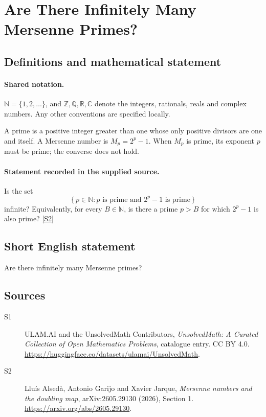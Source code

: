 \documentclass[11pt]{article}
\newcommand{\sref}[2]{\hyperlink{source:#1:#2}{[S#2]}}
\begin{document}
\section{Are There Infinitely Many Mersenne Primes?}\label{statement}

\subsection{Definitions and mathematical statement}

\paragraph{Shared notation.}$\mathbb N=\{1,2,\ldots\}$, and $\mathbb Z,\mathbb Q,\mathbb R,\mathbb C$ denote the integers, rationals, reals and complex numbers. Any other conventions are specified locally.


A prime is a positive integer greater than one whose only positive
divisors are one and itself.  A Mersenne number is \(M_p=2^p-1\).
When \(M_p\) is prime, its exponent \(p\) must be prime; the converse
does not hold.
\paragraph{Statement recorded in the supplied source.}
Is the set
\[
 \{\,p\in\mathbb N:p\text{ is prime and }2^p-1\text{ is prime}\,\}
\]
infinite?  Equivalently, for every \(B\in\mathbb N\), is there a prime
\(p>B\) for which \(2^p-1\) is also prime? \sref{statement}{2}
\subsection{Short English statement}
Are there infinitely many Mersenne primes?
\subsection{Sources}
\begin{description}
\item[\hypertarget{source:statement:1}{S1}] ULAM.AI and the UnsolvedMath Contributors, \emph{UnsolvedMath: A Curated Collection of Open Mathematics Problems}, catalogue entry. CC BY 4.0. \url{https://huggingface.co/datasets/ulamai/UnsolvedMath}.
\item[\hypertarget{source:statement:2}{S2}] Llu\'is Alsed\`a, Antonio Garijo and Xavier Jarque, \emph{Mersenne numbers and the doubling map}, arXiv:2605.29130 (2026), Section 1. \url{https://arxiv.org/abs/2605.29130}.
\end{description}
\label{end:statement}
\end{document}
